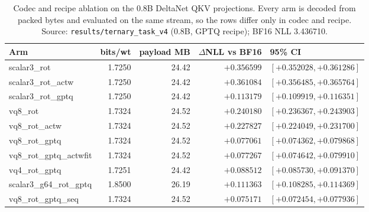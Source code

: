 \begin{table}[t]
\centering
\small
\begin{tabular}{lrrrl}
\toprule
Arm & bits/wt & payload MB & $\Delta$NLL vs BF16 & 95\% CI \\
\midrule
scalar3\_rot & 1.7250 & 24.42 & $+0.356599$ & $[+0.352028, +0.361286]$ \\
scalar3\_rot\_actw & 1.7250 & 24.42 & $+0.361084$ & $[+0.356485, +0.365764]$ \\
scalar3\_rot\_gptq & 1.7250 & 24.42 & $+0.113179$ & $[+0.109919, +0.116351]$ \\
vq8\_rot & 1.7324 & 24.52 & $+0.240180$ & $[+0.236367, +0.243903]$ \\
vq8\_rot\_actw & 1.7324 & 24.52 & $+0.227827$ & $[+0.224049, +0.231700]$ \\
vq8\_rot\_gptq & 1.7324 & 24.52 & $+0.077061$ & $[+0.074362, +0.079868]$ \\
vq8\_rot\_gptq\_actwfit & 1.7324 & 24.52 & $+0.077267$ & $[+0.074642, +0.079910]$ \\
vq4\_rot\_gptq & 1.7251 & 24.42 & $+0.088512$ & $[+0.085730, +0.091370]$ \\
scalar3\_g64\_rot\_gptq & 1.8500 & 26.19 & $+0.111363$ & $[+0.108285, +0.114369]$ \\
vq8\_rot\_gptq\_seq & 1.7324 & 24.52 & $+0.075171$ & $[+0.072454, +0.077936]$ \\
\bottomrule
\end{tabular}
\caption{Codec and recipe ablation on the 0.8B DeltaNet QKV projections. Every arm is decoded from packed bytes and evaluated on the same stream, so the rows differ only in codec and recipe. Source: \texttt{results/ternary\_task\_v4} (0.8B, GPTQ recipe); BF16 NLL 3.436710.}
\label{tab:v4}
\end{table}
